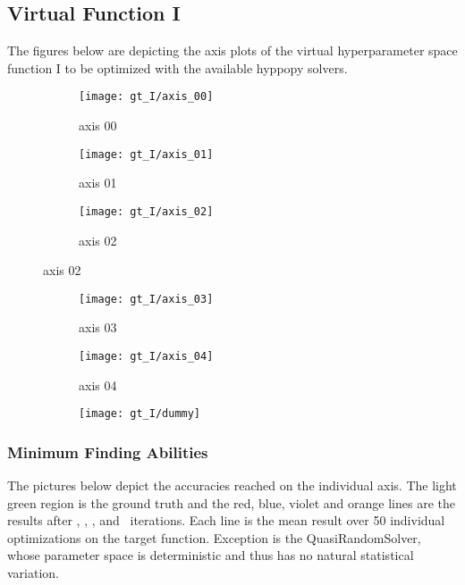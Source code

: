 \subsection{Virtual Function I}
The figures below are depicting the axis plots of the virtual hyperparameter space function I to be optimized with the available hyppopy solvers. 
\begin{figure}[h]
	\begin{subfigure}{0.32\textwidth}
		\texttt{[image: gt\_I/axis\_00]} 
		\caption{axis 00}
		\label{fig:axis00_I}
	\end{subfigure}
	\begin{subfigure}{0.32\textwidth}
		\texttt{[image: gt\_I/axis\_01]}
		\caption{axis 01}
		\label{fig:axis01_I}
	\end{subfigure}
	\begin{subfigure}{0.32\textwidth}
		\texttt{[image: gt\_I/axis\_02]}
		\caption{axis 02}
		\label{fig:axis02_I}
	\end{subfigure}
\end{figure}

\begin{figure}[h]
	\begin{subfigure}{0.32\textwidth}
		\texttt{[image: gt\_I/axis\_03]} 
		\caption{axis 03}
		\label{fig:axis03_I}
	\end{subfigure}
	\begin{subfigure}{0.32\textwidth}
		\texttt{[image: gt\_I/axis\_04]}
		\caption{axis 04}
		\label{fig:axis04_I}
	\end{subfigure}
	\begin{subfigure}{0.32\textwidth}
		\texttt{[image: gt\_I/dummy]}
		\caption{}
		\label{fig:dummy1_I}
	\end{subfigure}
\end{figure}


\newpage


\subsubsection{Minimum Finding Abilities}

The pictures below depict the accuracies reached on the individual axis. The light green region is the ground truth and the red, blue, violet and orange lines are the results after \myiterI, \myiterII, \myiterIII, and \myiterIV~iterations. Each line is the mean result over 50 individual optimizations on the target function. Exception is the QuasiRandomSolver, whose parameter space is deterministic and thus has no natural statistical variation. 

